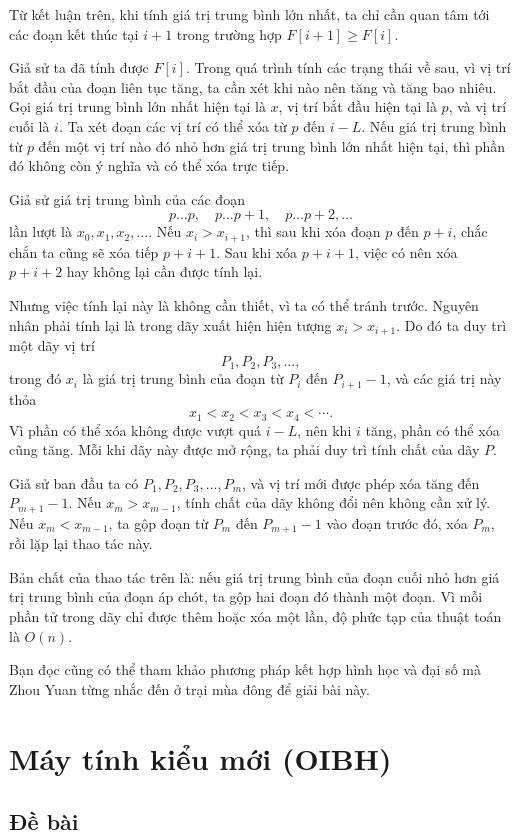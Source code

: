 \documentclass[11pt]{article}
\begin{document}
Từ kết luận trên, khi tính giá trị trung bình lớn nhất, ta chỉ cần quan tâm
tới các đoạn kết thúc tại $i+1$ trong trường hợp $F[i+1]\ge F[i]$.

Giả sử ta đã tính được $F[i]$. Trong quá trình tính các trạng thái về sau,
vì vị trí bắt đầu của đoạn liên tục tăng, ta cần xét khi nào nên tăng và tăng
bao nhiêu. Gọi giá trị trung bình lớn nhất hiện tại là $x$, vị trí bắt đầu
hiện tại là $p$, và vị trí cuối là $i$. Ta xét đoạn các vị trí có thể xóa từ
$p$ đến $i-L$. Nếu giá trị trung bình từ $p$ đến một vị trí nào đó nhỏ hơn
giá trị trung bình lớn nhất hiện tại, thì phần đó không còn ý nghĩa và có thể
xóa trực tiếp.

Giả sử giá trị trung bình của các đoạn
\[
  p\ldots p,\quad p\ldots p+1,\quad p\ldots p+2,\ldots
\]
lần lượt là $x_0,x_1,x_2,\ldots$. Nếu $x_i>x_{i+1}$, thì sau khi xóa đoạn
$p$ đến $p+i$, chắc chắn ta cũng sẽ xóa tiếp $p+i+1$. Sau khi xóa $p+i+1$,
việc có nên xóa $p+i+2$ hay không lại cần được tính lại.

Nhưng việc tính lại này là không cần thiết, vì ta có thể tránh trước. Nguyên
nhân phải tính lại là trong dãy xuất hiện hiện tượng $x_i>x_{i+1}$. Do đó ta
duy trì một dãy vị trí
\[
  P_1,P_2,P_3,\ldots,
\]
trong đó $x_i$ là giá trị trung bình của đoạn từ $P_i$ đến $P_{i+1}-1$, và
các giá trị này thỏa
\[
  x_1<x_2<x_3<x_4<\cdots.
\]
Vì phần có thể xóa không được vượt quá $i-L$, nên khi $i$ tăng, phần có thể
xóa cũng tăng. Mỗi khi dãy này được mở rộng, ta phải duy trì tính chất của
dãy $P$.

Giả sử ban đầu ta có $P_1,P_2,P_3,\ldots,P_m$, và vị trí mới được phép xóa
tăng đến $P_{m+1}-1$. Nếu $x_m>x_{m-1}$, tính chất của dãy không đổi nên
không cần xử lý. Nếu $x_m<x_{m-1}$, ta gộp đoạn từ $P_m$ đến $P_{m+1}-1$ vào
đoạn trước đó, xóa $P_m$, rồi lặp lại thao tác này.

Bản chất của thao tác trên là: nếu giá trị trung bình của đoạn cuối nhỏ hơn
giá trị trung bình của đoạn áp chót, ta gộp hai đoạn đó thành một đoạn. Vì
mỗi phần tử trong dãy chỉ được thêm hoặc xóa một lần, độ phức tạp của thuật
toán là $O(n)$.

Bạn đọc cũng có thể tham khảo phương pháp kết hợp hình học và đại số mà Zhou
Yuan từng nhắc đến ở trại mùa đông để giải bài này.

\section{Máy tính kiểu mới (OIBH)}

\subsection*{Đề bài}
\end{document}
